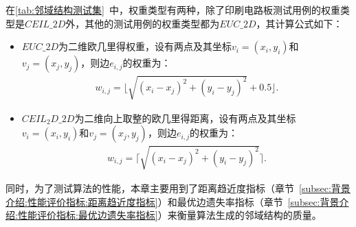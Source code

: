 \par
在\autoref{tab:邻域结构测试集}~中，权重类型\cite{reinelt1995tsplib95}有两种，除了印刷电路板测试用例的权重类型是$CEIL\_2D$外，其他的测试用例的权重类型都为$EUC\_2D$，其计算公式如下：
\begin{itemize}
    \item $EUC\_2D$为二维欧几里得权重，设有两点及其坐标$v_i = (x_i, y_i)$和$v_j = (x_j, y_j)$，则边$e_{i,j}$的权重为：
    \vspace{-1.5em}
    \begin{align}
        \label{eq:EUC2D}
        w_{i,j} = \lfloor \sqrt{(x_i-x_j)^2 + (y_i-y_j)^2} + 0.5 \rfloor .
    \end{align}
    \vspace{-1.5em}
    \item $CEIL_2D\_2D$为二维向上取整的欧几里得距离，设有两点及其坐标$v_i = (x_i, y_i)$和$v_j = (x_j, y_j)$，则边$e_{i,j}$的权重为：
    \vspace{-1.5em}
    \begin{align}
        \label{eq:CEIL2D}
        w_{i,j} = \lceil \sqrt{(x_i-x_j)^2 + (y_i-y_j)^2} \rceil .
    \end{align}
\end{itemize}
\par
同时，为了测试算法的性能，本章主要用到了距离趋近度指标（章节~\ref{subsec:背景介绍:性能评价指标:距离趋近度指标}）和最优边遗失率指标（章节~\ref{subsec:背景介绍:性能评价指标:最优边遗失率指标}）来衡量算法生成的邻域结构的质量。

